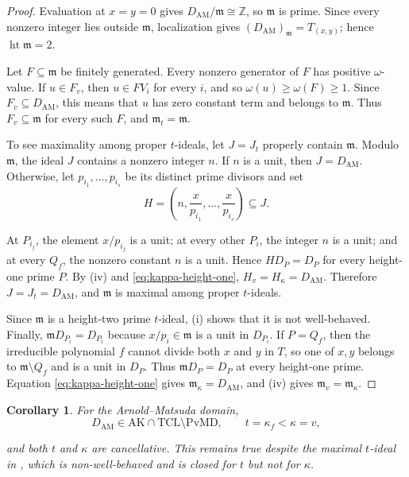 \documentclass[11pt]{amsart}
\newtheorem{corollary}[corollary]{Corollary}
\theoremstyle{definition}
\theoremstyle{remark}
\newcommand{\PvMD}{\mathrm{PvMD}}
\newcommand{\TCL}{\mathrm{TCL}}
\newcommand{\AK}{\mathrm{AK}}
\begin{document}
\begin{proof}
Evaluation at $x=y=0$ gives
$D_{\mathrm{AM}}/\mathfrak m\cong\mathbb Z$, so $\mathfrak m$ is prime.
Since every nonzero integer lies outside $\mathfrak m$, localization gives
$(D_{\mathrm{AM}})_{\mathfrak m}=T_{(x,y)}$; hence
$\operatorname{ht}\mathfrak m=2$.

Let $F\subseteq\mathfrak m$ be finitely generated.  Every nonzero generator
of $F$ has positive $\omega$-value.  If $u\in F_v$, then
$u\in FV_i$ for every $i$, and so
$\omega(u)\geq\omega(F)\geq1$.  Since $F_v\subseteq D_{\mathrm{AM}}$, this
means that $u$ has zero constant term and belongs to $\mathfrak m$.  Thus
$F_v\subseteq\mathfrak m$ for every such $F$, and
$\mathfrak m_t=\mathfrak m$.

To see maximality among proper $t$-ideals, let $J=J_t$ properly contain
$\mathfrak m$.  Modulo $\mathfrak m$, the ideal $J$ contains a nonzero
integer $n$.  If $n$ is a unit, then $J=D_{\mathrm{AM}}$.  Otherwise, let
$p_{i_1},\ldots,p_{i_s}$ be its distinct prime divisors and set
\begin{equation}\label{eq:AM-H}
 H=\left(n,\frac{x}{p_{i_1}},\ldots,\frac{x}{p_{i_s}}\right)
 \subseteq J.
\end{equation}

At $P_{i_j}$, the element $x/p_{i_j}$ is a unit; at every other $P_i$, the
integer $n$ is a unit; and at every $Q_f$, the nonzero constant $n$ is a
unit.  Hence $HD_P=D_P$ for every height-one prime $P$.  By
(iv) and \eqref{eq:kappa-height-one},
$H_v=H_\kappa=D_{\mathrm{AM}}$.  Therefore $J=J_t=D_{\mathrm{AM}}$, and
$\mathfrak m$ is maximal among proper $t$-ideals.

Since $\mathfrak m$ is a height-two prime $t$-ideal,
(i) shows that it is not well-behaved.  Finally,
$\mathfrak mD_{P_i}=D_{P_i}$ because $x/p_i\in\mathfrak m$ is a unit in
$D_{P_i}$.  If $P=Q_f$, then the irreducible polynomial $f$ cannot divide
both $x$ and $y$ in $T$, so one of $x,y$ belongs to
$\mathfrak m\setminus Q_f$ and is a unit in $D_P$.  Thus
$\mathfrak mD_P=D_P$ at every height-one prime.  Equation
\eqref{eq:kappa-height-one} gives $\mathfrak m_\kappa=D_{\mathrm{AM}}$, and
(iv) gives
$\mathfrak m_v=\mathfrak m_\kappa$.
\end{proof}

\begin{corollary}\label{cor:AM-descent}
For the Arnold--Matsuda domain,
\begin{equation}\label{eq:AM-strict-descent}
 D_{\mathrm{AM}}\in\AK\cap\TCL\setminus\PvMD,
 \qquad t=\kappa_f<\kappa=v,
\end{equation}

and both $t$ and $\kappa$ are cancellative.  This remains true despite the
maximal $t$-ideal in , which is non-well-behaved and is
closed for $t$ but not for $\kappa$.
\end{corollary}
\end{document}
